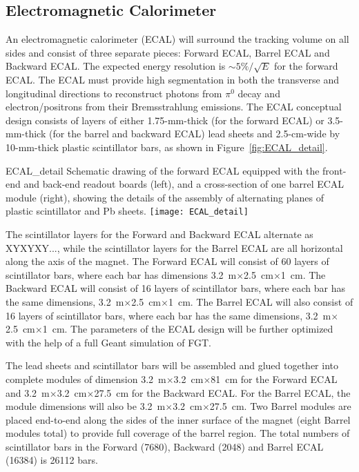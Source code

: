 \subsection{Electromagnetic Calorimeter}
\label{cdrsec:detectors-nd-ref-fgt-ecal}

An electromagnetic calorimeter (ECAL) will surround the tracking
volume on all sides and consist of three separate pieces: Forward
ECAL, Barrel ECAL and Backward ECAL.  The expected energy resolution
is $\sim 5\% / \sqrt{E}$ for the forward ECAL.  The ECAL must provide
high segmentation in both the transverse and longitudinal directions
to reconstruct photons from $\pi^0$ decay and electron/positrons from
their Bremsstrahlung emissions.  The ECAL conceptual design consists
of layers of either 1.75-mm-thick (for the forward ECAL) or
3.5-mm-thick (for the barrel and backward ECAL) lead sheets and
2.5-cm-wide by 10-mm-thick plastic scintillator bars, as shown in
Figure~\ref{fig:ECAL_detail}.
\begin{cdrfigure}{ECAL_detail}
{Schematic drawing of the forward ECAL equipped with the front-end and back-end readout boards (left), 
and a cross-section of one barrel ECAL module (right), showing the details of the assembly of alternating planes
of plastic scintillator and Pb sheets.}
\texttt{[image: ECAL\_detail]}
\end{cdrfigure}
The scintillator layers for the Forward and Backward ECAL alternate as
XYXYXY..., while the scintillator layers for the Barrel ECAL are all
horizontal along the axis of the magnet.  The Forward ECAL will
consist of 60 layers of scintillator bars, where each bar has
dimensions 3.2~m$\times$2.5~cm$\times$1~cm. The Backward ECAL will
consist of 16 layers of scintillator bars, where each bar has the same
dimensions, 3.2~m$\times$2.5~cm$\times$1~cm. The Barrel ECAL will also
consist of 16 layers of scintillator bars, where each bar has the same
dimensions, 3.2~m$\times$2.5~cm$\times$1~cm. The parameters of the
ECAL design will be further optimized with the help of a full Geant
simulation of FGT.

The lead sheets and scintillator bars will be assembled and glued
together into complete modules of dimension
3.2~m$\times$3.2~cm$\times$81~cm for the Forward ECAL and
3.2~m$\times$3.2~cm$\times$27.5~cm for the Backward ECAL. For the
Barrel ECAL, the module dimensions will also be
3.2~m$\times$3.2~cm$\times$27.5~cm. Two Barrel modules are placed
end-to-end along the sides of the inner surface of the magnet (eight
Barrel modules total) to provide full coverage of the barrel region.
The total numbers of scintillator bars in the Forward (7680), Backward
(2048) and Barrel ECAL (16384) is 26112 bars.

